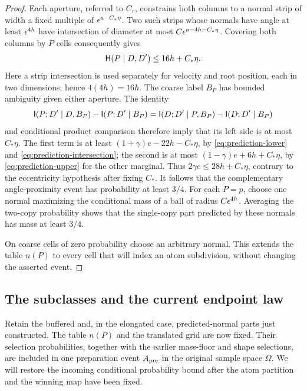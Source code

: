 \begin{proof}
Each aperture, referred to \(C_r\), constrains both columns to a
normal strip of width a fixed multiple of \(\epsilon^{a-C_*\eta}\).
Two such strips whose normals have angle at least \(\epsilon^{4h}\)
have intersection of diameter at most
\(C\epsilon^{a-4h-C_*\eta}\).
Covering both columns by \(P\) cells consequently gives
\begin{equation}
 \mathsf H(P\mid D,D')\leq16h+C_*\eta.
 \label{eq:prediction-intersection}
\end{equation}
Here a strip intersection is used separately for velocity and root
position, each in two dimensions; hence \(4(4h)=16h\).
The coarse label \(B_P\) has bounded ambiguity given either aperture.
The identity
\[
 \mathsf I(P;D'\mid D,B_P)-\mathsf I(P;D'\mid B_P)
 =\mathsf I(D;D'\mid P,B_P)-\mathsf I(D;D'\mid B_P)
\]
and conditional product comparison therefore imply that its left
side is at most \(C_*\eta\).
The first term is at least
\((1+\gamma)e-22h-C_*\eta\), by
\eqref{eq:prediction-lower} and
\eqref{eq:prediction-intersection}; the second is at most
\((1-\gamma)e+6h+C_*\eta\), by
\eqref{eq:prediction-upper} for the other marginal.
Thus \(2\gamma e\leq28h+C_*\eta\), contrary to the eccentricity
hypothesis after fixing \(C_*\).
It follows that the complementary angle-proximity event has
probability at least \(3/4\).  For each \(P=p\), choose one normal
maximizing the conditional mass of a ball of radius
\(C\epsilon^{4h}\).  Averaging the two-copy probability shows that the
single-copy part predicted by these normals has mass at least
\(3/4\).

On coarse cells of zero probability choose an arbitrary normal.
This extends the table \(n(P)\) to every cell that will index an atom
subdivision, without changing the asserted event.
\end{proof}


\subsection{The subclasses and the current endpoint law}

Retain the buffered and, in the elongated case, predicted-normal
parts just constructed.  The table \(n(P)\) and the translated grid
are now fixed.  Their selection probabilities, together with the
earlier mass-floor and shape selections, are included in one
preparation event \(A_{\rm pre}\) in the original sample space
\(\Omega\).  We will restore the incoming conditional probability
bound after the atom partition and the winning map have been fixed.

